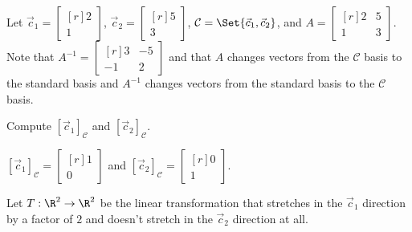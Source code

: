 \documentclass{problemset}
\newcommand{\mat}[1]{\begin{bmatrix*}[r]#1\end{bmatrix*}}
\begin{document}
	\question
	Let $\vec c_1=\mat{2\\1}$, $\vec c_2=\mat{5\\3}$, $\mathcal C=\Set{\vec c_1,\vec c_2}$, and $A=\mat{2&5\\1&3}$.
	Note that $A^{-1}=\mat{3&-5\\-1&2}$ and that $A$ changes vectors from the $\mathcal C$ basis to the standard
	basis and $A^{-1}$ changes vectors from the standard basis to the $\mathcal C$ basis.
	\begin{parts}
		\item Compute $[\vec c_1]_{\mathcal C}$ and $[\vec c_2]_{\mathcal C}$.
			\begin{solution}[inline]
				$[\vec c_1]_{\mathcal C}=\mat{1\\0}$ and 
				$[\vec c_2]_{\mathcal C}=\mat{0\\1}$.
			\end{solution}
	\end{parts}
	Let $T:\R^2\to\R^2$ be the linear transformation that stretches in the $\vec c_1$ direction by a factor of $2$
	and doesn't stretch in the $\vec c_2$ direction at all.
\end{document}

